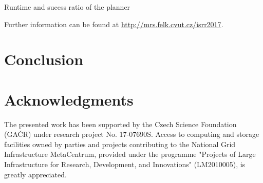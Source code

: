 \documentclass{svmult}
\begin{document}
\begin{table}
\centering
\caption{\label{tab::rrt}
    Runtime and sucess ratio of the planner
}

\hskip 10pt
%
\end{table}



Further information can be found at {\url{http://mrs.felk.cvut.cz/isrr2017}}.

\section{Conclusion }


\section{Acknowledgments}

The presented work has been supported by the Czech Science Foundation (GA{\v C}R) under research project No. 17-07690S.
Access to computing and storage facilities owned by parties and projects contributing to the National Grid Infrastructure MetaCentrum, provided under the programme "Projects of Large Infrastructure for Research, Development, and Innovations" (LM2010005), is greatly appreciated.




\end{document}
